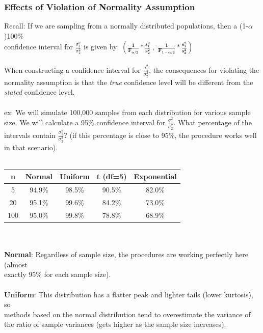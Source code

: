 \documentclass[12pt, a4paper]{article}
\begin{document}
	\subsubsection{Effects of Violation of Normality Assumption}
	Recall: If we are sampling from a normally distributed populations, then a (1-$\alpha$)100\%  \\ confidence interval for $\frac{\sigma^2_1}{\sigma^2_2}$ is given by: \large $\bm{(\frac{1}{F_{\alpha/2}}*\frac{s^2_1}{s^2_2}\;,\;\frac{1}{F_{1-\alpha/2}}*\frac{s^2_1}{s^2_2})}$ \normalsize \\~\\
	When constructing a confidence interval for $\frac{\sigma^2_1}{\sigma^2_2}$, the consequences for violating the normality assumption is that the \textit{true} confidence level will be different from the \textit{stated} confidence level. \\~\\
	ex: We will simulate 100,000 samples from each distribution for various sample size. We will calculate a 95\% confidence interval for $\frac{\sigma^2_1}{\sigma^2_2}$. What percentage of the intervals contain $\frac{\sigma^2_1}{\sigma^2_2}$? (if this percentage is close to 95\%, the procedure works well in that scenario). \\~\\
	\begin{tabular}{ |c|c|c|c|c| }
		\hline
		n & Normal & Uniform & t (df=5) & Exponential \\ \hline
		5 & 94.9\% & 98.5\% & 90.5\% & 82.0\% \\
		20 & 95.1\% & 99.6\% & 84.2\% & 73.0\% \\
		100 & 95.0\% & 99.8\% & 78.8\% & 68.9\% \\
		\hline
	\end{tabular} \\~\\
	\textbf{Normal}: Regardless of sample size, the procedures are working perfectly here (almost \\ \hspace*{17mm} exactly 95\% for each sample size). \\~\\
	\textbf{Uniform}: This distribution has a flatter peak and lighter tails (lower kurtosis), so \\ \hspace*{20mm} methods based on the normal distribution tend to overestimate the variance of \hspace*{20mm} the ratio of sample variances (gets higher as the sample size increases). \\~\\
\end{document}
